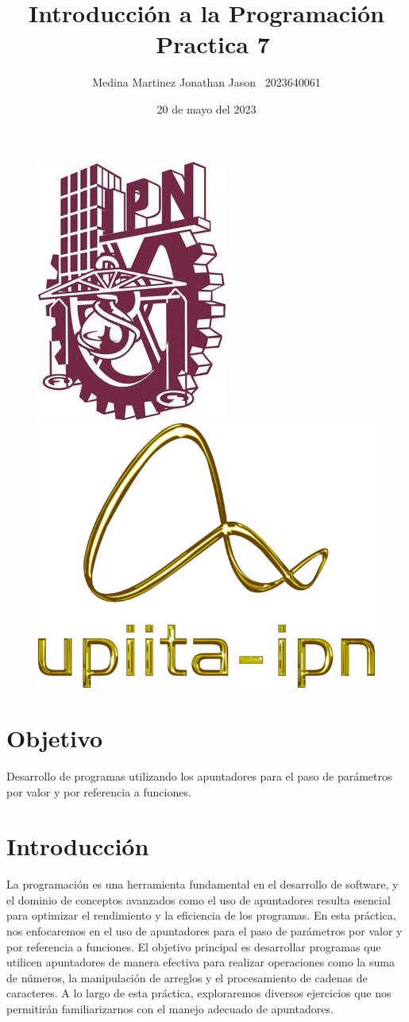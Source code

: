 \documentclass{article}
\title{Introducción a la Programación \ Practica 7}
\author{Medina Martinez Jonathan Jason \ 2023640061}
\date{20 de mayo del 2023}
\begin{document}
	
	\fontsize{12}{16}\selectfont
	
	\begin{figure}[t] %
		
		\includegraphics[width=2.5 cm]{Logo1.jpeg}
		\hfill
		\includegraphics[width=3 cm]{Logo2.png}
		
	\end{figure}
	
	\maketitle %
	\newpage
	
	\tableofcontents %
	\newpage
	
	\section{Objetivo}
	
	Desarrollo de programas utilizando los apuntadores para el paso de parámetros por valor y por referencia a funciones.
	
	\section{Introducción}
	
	La programación es una herramienta fundamental en el desarrollo de software, y el dominio de conceptos avanzados como el uso de apuntadores resulta esencial para optimizar el rendimiento y la eficiencia de los programas. En esta práctica, nos enfocaremos en el uso de apuntadores para el paso de parámetros por valor y por referencia a funciones. El objetivo principal es desarrollar programas que utilicen apuntadores de manera efectiva para realizar operaciones como la suma de números, la manipulación de arreglos y el procesamiento de cadenas de caracteres. A lo largo de esta práctica, exploraremos diversos ejercicios que nos permitirán familiarizarnos con el manejo adecuado de apuntadores.
	
\end{document}
